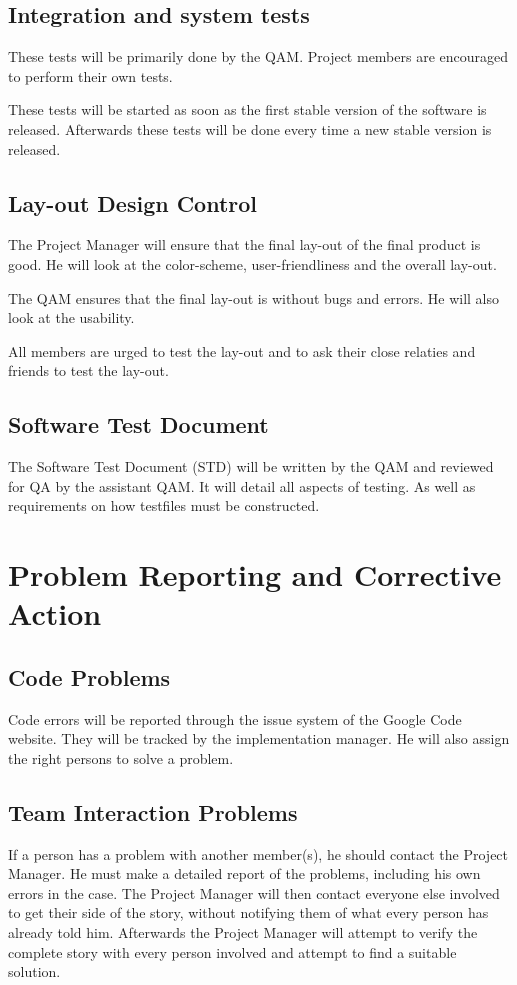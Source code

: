 \documentclass[salesmen, twoside]{../../../templates/latex/2009/softproj}
\begin{document}
\begin{projdoc}
\section{Integration and system tests}
These tests will be primarily done by the QAM. Project members are encouraged to perform their own tests.

These tests will be started as soon as the first stable version of the software is released. Afterwards these tests will be done every time a new stable version is released.

\section{Lay-out Design Control}
The Project Manager will ensure that the final lay-out of the final product is good. He will look at the color-scheme, user-friendliness and the overall lay-out.

The QAM ensures that the final lay-out is without bugs and errors. He will also look at the usability.

All members are urged to test the lay-out and to ask their close relaties and friends to test the lay-out.

\section{Software Test Document}
The Software Test Document (STD)\cite{STD} will be written by the QAM and reviewed for QA by the assistant QAM. It will detail all aspects of testing. As well as requirements on how testfiles must be constructed.


\chapter{Problem Reporting and Corrective Action}
\section{Code Problems}
Code errors will be reported through the issue system of the Google Code website\cite{googleSVN}. They will be tracked by the implementation manager. He will also assign the right persons to solve a problem.

\section{Team Interaction Problems}
If a person has a problem with another member(s), he should contact the Project Manager. He must make a detailed report of the problems, including his own errors in the case. The Project Manager will then contact everyone else involved to get their side of the story, without notifying them of what every person has already told him. Afterwards the Project Manager will attempt to verify the complete story with every person involved and attempt to find a suitable solution.


\end{projdoc}
\end{document}
